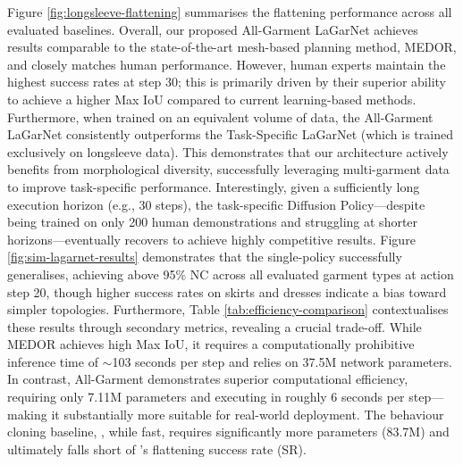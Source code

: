 \documentclass[journal]{IEEEtran}
\begin{document}
Figure \ref{fig:longsleeve-flattening} summarises the flattening performance across all evaluated baselines. Overall, our proposed All-Garment LaGarNet achieves results comparable to the state-of-the-art mesh-based planning method, MEDOR, and closely matches human performance. However, human experts maintain the highest success rates at step 30; this is primarily driven by their superior ability to achieve a higher Max IoU compared to current learning-based methods. Furthermore, when trained on an equivalent volume of data, the All-Garment LaGarNet consistently outperforms the Task-Specific LaGarNet (which is trained exclusively on longsleeve data). This demonstrates that our architecture actively benefits from morphological diversity, successfully leveraging multi-garment data to improve task-specific performance. Interestingly, given a sufficiently long execution horizon (e.g., 30 steps), the task-specific Diffusion Policy---despite being trained on only 200 human demonstrations and struggling at shorter horizons---eventually recovers to achieve highly competitive results. Figure \ref{fig:sim-lagarnet-results} demonstrates that the single-policy  successfully generalises, achieving above 95\% NC across all evaluated garment types at action step 20, though higher success rates on skirts and dresses indicate a bias toward simpler topologies.
Furthermore, Table \ref{tab:efficiency-comparison} contextualises these results through secondary metrics, revealing a crucial trade-off. While MEDOR achieves high Max IoU, it requires a computationally prohibitive inference time of $\sim$103 seconds per step and relies on 37.5M network parameters. In contrast, All-Garment  demonstrates superior computational efficiency, requiring only 7.11M parameters and executing in roughly 6 seconds per step—making it substantially more suitable for real-world deployment. The behaviour cloning baseline, , while fast, requires significantly more parameters (83.7M) and ultimately falls short of 's flattening success rate (SR).
\end{document}

